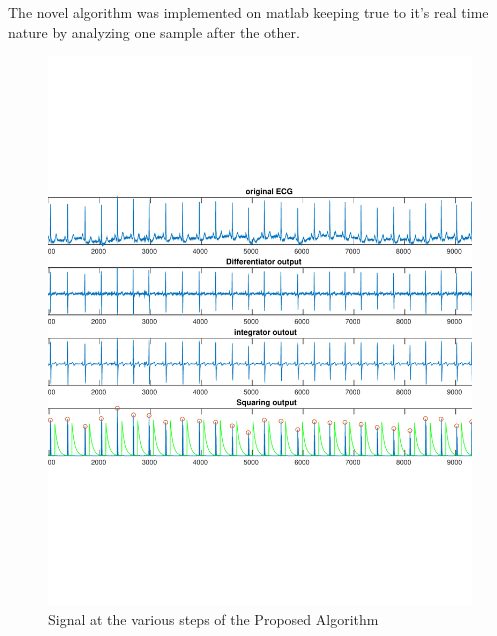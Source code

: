 \documentclass{article}
\begin{document}
The novel algorithm was implemented on matlab keeping true to it's real time nature by analyzing one sample after the other. 

\begin{figure}%
        \centering
        \includegraphics[scale=0.4]{./figs/rivas30.pdf}
        \caption{Signal at the various steps of the Proposed Algorithm}
        \label{fig:rivas}
\end{figure}
\end{document}
